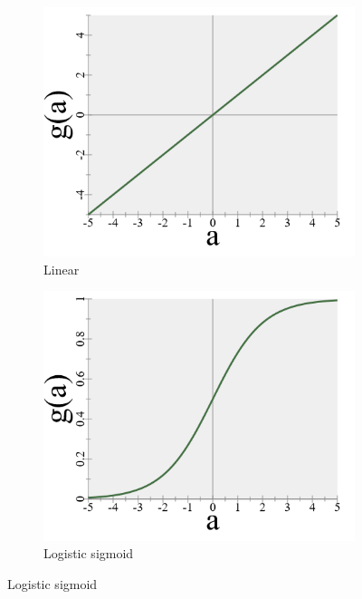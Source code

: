 \begin{figure} \label{fig:activation}
    \centering
    \begin{subfigure}[b]{0.3\textwidth}
        \includegraphics[width=\textwidth]{images/4_linear.png}
        \caption{Linear}
        \label{fig:activation_linear}
    \end{subfigure}
    \begin{subfigure}[b]{0.3\textwidth}
        \includegraphics[width=\textwidth]{images/4_sigmoid.png}
        \caption{Logistic sigmoid}
        \label{fig:activation_sigmoid}
    \end{subfigure}

\end{figure}

